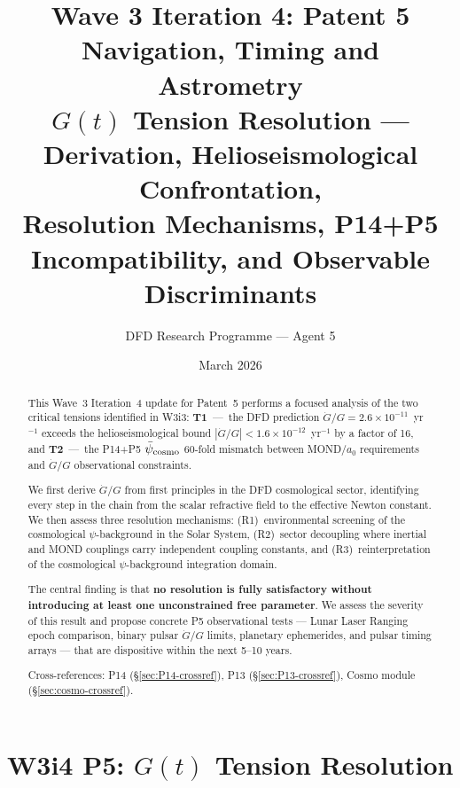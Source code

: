 \documentclass[aps,prd,twocolumn,superscriptaddress,nofootinbib,longbibliography]{revtex4-2}
\newcommand{\psibar}{\bar{\psi}}
\newcommand{\ee}[1]{\times 10^{#1}}
\begin{document}
\title{Wave 3 Iteration 4: Patent 5 Navigation, Timing and Astrometry\\
$G(t)$ Tension Resolution --- Derivation, Helioseismological Confrontation,\\
Resolution Mechanisms, P14+P5 Incompatibility, and Observable Discriminants}

\author{DFD Research Programme --- Agent 5}
\date{March 2026}

\begin{abstract}
This Wave~3 Iteration~4 update for Patent~5 performs a focused analysis of
the two critical tensions identified in W3i3: \textbf{T1}~---~the DFD
prediction $\dot{G}/G = 2.6\ee{-11}$~yr$^{-1}$ exceeds the helioseismological
bound $|\dot{G}/G| < 1.6\ee{-12}$~yr$^{-1}$ by a factor of 16, and
\textbf{T2}~---~the P14+P5 $\psibar_{\rm cosmo}$ 60-fold mismatch between
MOND/$a_0$ requirements and $\dot{G}/G$ observational constraints.

We first derive $\dot{G}/G$ from first principles in the DFD cosmological
sector, identifying every step in the chain from the scalar refractive field
to the effective Newton constant.  We then assess three resolution mechanisms:
(R1)~environmental screening of the cosmological $\psi$-background in the Solar
System, (R2)~sector decoupling where inertial and MOND couplings carry
independent coupling constants, and (R3)~reinterpretation of the cosmological
$\psi$-background integration domain.

The central finding is that \textbf{no resolution is fully satisfactory
without introducing at least one unconstrained free parameter}. We assess
the severity of this result and propose concrete P5 observational tests
--- Lunar Laser Ranging epoch comparison, binary pulsar $\dot{G}/G$ limits,
planetary ephemerides, and pulsar timing arrays --- that are dispositive
within the next 5--10 years.

Cross-references: P14 (\S\ref{sec:P14-crossref}), P13 (\S\ref{sec:P13-crossref}),
Cosmo module (\S\ref{sec:cosmo-crossref}).
\end{abstract}

\maketitle

\section{W3i4 P5: $G(t)$ Tension Resolution}
\label{sec:main}
\end{document}
